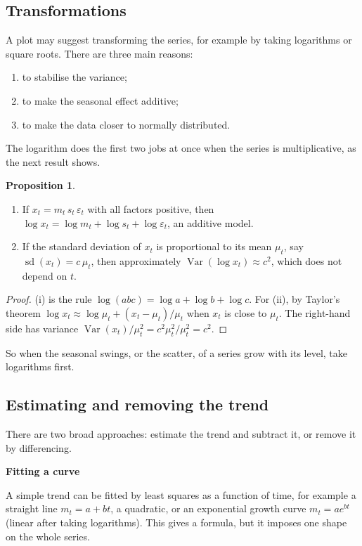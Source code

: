 \documentclass[11pt,a4paper]{article}
\theoremstyle{definition}
\newtheorem{prop}[thm]{Proposition}
\newcommand{\subhead}[1]{%
  \par\medskip\noindent\textbf{#1}\par\nobreak\smallskip}
\DeclareMathOperator{\Var}{Var}
\begin{document}
\subsection{Transformations}
A plot may suggest transforming the series, for example by taking logarithms or square roots. There are three
main reasons:
\begin{enumerate}
\item to stabilise the variance;
\item to make the seasonal effect additive;
\item to make the data closer to normally distributed.
\end{enumerate}
The logarithm does the first two jobs at once when the series is multiplicative, as the next result shows.

\begin{prop}\label{prop:ts-log}
\begin{enumerate}[label=(\roman*)]
\item If $x_t = m_t\,s_t\,\varepsilon_t$ with all factors positive, then $\log x_t = \log m_t + \log s_t + \log\varepsilon_t$, an additive model.
\item If the standard deviation of $x_t$ is proportional to its mean $\mu_t$, say $\operatorname{sd}(x_t) = c\,\mu_t$, then approximately
$\Var(\log x_t) \approx c^2$, which does not depend on $t$.
\end{enumerate}
\end{prop}

\begin{proof}
(i) is the rule $\log(abc) = \log a + \log b + \log c$. For (ii), by Taylor's theorem $\log x_t \approx \log\mu_t + (x_t - \mu_t)/\mu_t$ when $x_t$ is
close to $\mu_t$. The right-hand side has variance $\Var(x_t)/\mu_t^2 = c^2\mu_t^2/\mu_t^2 = c^2$.
\end{proof}

So when the seasonal swings, or the scatter, of a series grow with its level, take logarithms first.

\subsection{Estimating and removing the trend}
There are two broad approaches: estimate the trend and subtract it, or remove it by differencing.

\subhead{Fitting a curve}
A simple trend can be fitted by least squares as a function of time, for example a straight line $m_t = a + bt$, a
quadratic, or an exponential growth curve $m_t = ae^{bt}$ (linear after taking logarithms). This gives a formula,
but it imposes one shape on the whole series.
\end{document}
